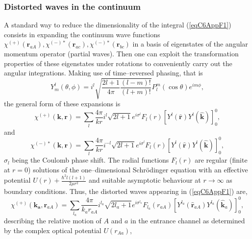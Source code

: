 \subsubsection{Distorted waves in the continuum}
A standard way to reduce the dimensionality of the integral (\ref{eqC6AppF1}) consists in expanding the continuum wave functions $\chi^{(+)}(\mathbf{r}_{aA}),\chi^{(-)*}(\mathbf{r}_{ac}),\chi^{(-)*}(\mathbf{r}_{bc})$ in a basis of eigenstates of the angular momentum operator (partial waves). Then one can exploit the transformation properties of these eigenstates under rotations to conveniently carry out the angular integrations. Making use of time--reversed phasing, that is
\begin{equation}\label{eq6G3}
Y_m^l(\theta,\phi)=i^l \sqrt{\frac{2l+1}{4\pi}\frac{(l-m)!}{(l+m)!}}P_l^m(\cos \theta)e^{im\phi},
\end{equation}
 the general form of these expansions is
 \begin{equation}\label{eqC6AppF2}
\chi^{(+)}(\mathbf{k},\mathbf{r})= \sum_{l}\frac{4\pi}{k r} i^{l}\sqrt{2l+1}
e^{i\sigma^{l}} F_{l}(r) \left[ Y^{l} (\hat {\mathbf{r}}) Y^{l} (\hat {\mathbf{k}})\right]^0_0,
\end{equation}
and
 \begin{equation}\label{eqC6AppF3}
\chi^{(-)*}(\mathbf{k},\mathbf{r})= \sum_{l}\frac{4\pi}{k r} i^{-l}\sqrt{2l+1}
e^{i\sigma^{l}} F_{l}(r) \left[ Y^{l} (\hat {\mathbf{r}}) Y^{l} (\hat {\mathbf{k}})\right]^0_0,
\end{equation}
$\sigma_l$ being the Coulomb phase shift. The radial functions $F_{l}(r)$ are regular (finite at $r=0$) solutions of the one--dimensional Schr\"{o}dinger equation with an effective potential $U(r)+\tfrac{\hbar^2 l(l+1)}{2\mu r^2}$ and suitable asymptotic behaviour at $r\rightarrow\infty$ as boundary conditions. 
Thus, the distorted waves appearing in (\ref{eqC6AppF1}) are,
 \begin{equation}\label{eq4}
\chi^{(+)}(\mathbf{k_{a}},\mathbf{r}_{aA})= \sum_{l_a}\frac{4\pi}{k_a r_{aA}} i^{l_a}\sqrt{2l_a+1}
e^{i\sigma^{l_a}} F_{l_a}(r_{aA}) \left[ Y^{l_a} (\hat{\mathbf r}_{aA}) Y^{l_a} (\hat{ \mathbf k}_{a})\right]^0_0,
\end{equation}
describing the relative motion of $A$ and $a$ in the entrance channel as determined by  the complex optical potential $U(r_{Aa})$,
